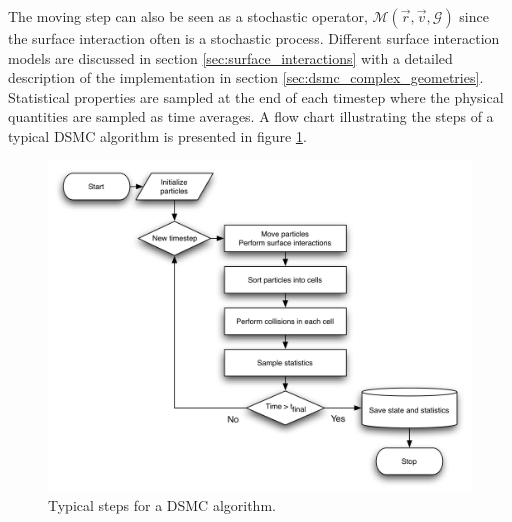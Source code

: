 The moving step can also be seen as a stochastic operator, $\mathcal{M}(\vec r, \vec v, \mathcal{G})$ since the surface interaction often is a stochastic process. Different surface interaction models are discussed in section \ref{sec:surface_interactions} with a detailed description of the implementation in section \ref{sec:dsmc_complex_geometries}. Statistical properties are sampled at the end of each timestep where the physical quantities are sampled as time averages. A flow chart illustrating the steps of a typical DSMC algorithm is presented in figure \ref{fig:dsmc_flowchart}.
\begin{figure}[ht]
\begin{center}
\includegraphics[width=\textwidth, trim=0cm 0cm 0cm 0cm, clip]{DSMC/figures/dsmc_flowchart.png}
\end{center}
\caption{Typical steps for a DSMC algorithm.}
\label{fig:dsmc_flowchart}
\end{figure}


